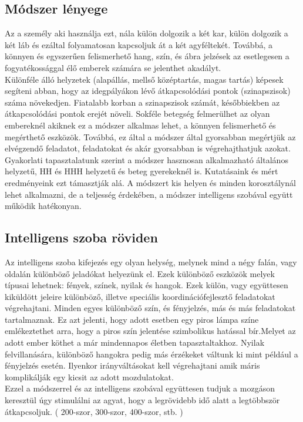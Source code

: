 \documentclass[tocnopagenum]{thesis-ekf}
\theoremstyle{definition}
\theoremstyle{remark}
\begin{document}
	\subsection*{Módszer lényege}
	Az a személy aki használja ezt, nála külön dolgozik a két kar, külön dolgozik a két láb és ezáltal folyamatosan kapcsoljuk át a két agyféltekét.
	Továbbá, a könnyen és egyszerűen felismerhető hang, szín, és ábra jelzések az esetlegesen a fogyatékossággal élő emberek számára se jelenthet akadályt.
	\\
	Különféle álló helyzetek (alapállás, mellső középtartás, magas tartás) képesek segíteni abban, hogy az idegpályákon lévő átkapcsolódási pontok (szinapszisok) száma növekedjen. Fiatalabb korban a szinapszisok számát, későbbiekben az átkapcsolódási pontok erejét növeli.
	Sokféle betegség felmerülhet az olyan embereknél akiknek ez a módszer alkalmas lehet, a könnyen felismerhető és megérthető eszközök.
	Továbbá, ez által a módszer által gyorsabban megértjük az elvégzendő  feladatot, feladatokat és akár gyorsabban is végrehajthatjuk azokat.
	 \\
	Gyakorlati tapasztalatunk szerint a módszer hasznosan alkalmazható általános helyzetű, HH és HHH helyzetű és beteg gyerekeknél is. Kutatásaink és mért eredményeink ezt támasztják alá.
	A módszert kis helyen és minden korosztálynál lehet alkalmazni, de a teljesség érdekében, a módszer intelligens szobával együtt működik hatékonyan.
	
	
	\subsection*{Intelligens szoba röviden}
	Az intelligens szoba kifejezés egy olyan helység, melynek mind a négy falán, vagy oldalán különböző jeladókat helyezünk el.
	Ezek különböző eszközök melyek típusai lehetnek: fények, színek, nyilak és hangok. Ezek külön, vagy együttesen kiküldött jeleire különböző, illetve speciális koordinációfejlesztő feladatokat végrehajtani. Minden egyes különböző szín, és fényjelzés, más és más feladatokat tartalmaznak.
	Ez azt jelenti, hogy adott esetben egy piros lámpa színe emlékeztethet arra, hogy a piros szín jelentése szimbolikus hatással bír.Melyet az adott ember köthet a már mindennapos életben tapasztaltakhoz. Nyilak felvillanására, különböző hangokra pedig más érzékeket váltunk ki mint például a fényjelzés esetén. Ilyenkor irányváltásokat kell végrehajtani amik máris komplikálják egy kicsit az adott mozdulatokat.
	\\
	Ezzel a módszerrel és az intelligens szobával együttesen tudjuk a mozgáson keresztül úgy stimulálni az agyat, hogy a legrövidebb idő alatt a legtöbbször átkapcsoljuk. ( 200-szor, 300-szor, 400-szor, stb. )
	\par
\end{document}
